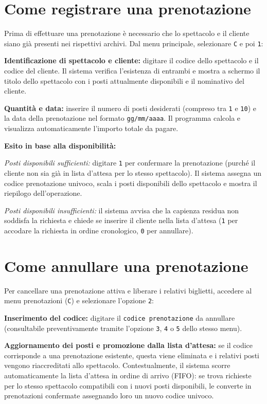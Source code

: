 \documentclass[11pt,a4paper,oneside,openany]{book}
\newenvironment{listacomp}{%
    \small
    \begin{list}{\textendash}{%
        \setlength{\topsep}{2pt}%
        \setlength{\partopsep}{0pt}%
        \setlength{\itemsep}{1pt}%
        \setlength{\parsep}{0pt}%
        \setlength{\leftmargin}{1.2em}%
    }%
}{%
    \end{list}%
}
\begin{document}
\section{Come registrare una prenotazione}
Prima di effettuare una prenotazione è necessario che lo spettacolo e il cliente siano già presenti nei rispettivi archivi. Dal menu principale, selezionare \texttt{C} e poi \texttt{1}:
\begin{listacomp}
    \item \textbf{Identificazione di spettacolo e cliente:} digitare il codice dello spettacolo e il codice del cliente. Il sistema verifica l'esistenza di entrambi e mostra a schermo il titolo dello spettacolo con i posti attualmente disponibili e il nominativo del cliente.
    \item \textbf{Quantità e data:} inserire il numero di posti desiderati (compreso tra \texttt{1} e \texttt{10}) e la data della prenotazione nel formato \texttt{gg/mm/aaaa}. Il programma calcola e visualizza automaticamente l'importo totale da pagare.
    \item \textbf{Esito in base alla disponibilità:}
    \begin{listacomp}
        \item \emph{Posti disponibili sufficienti:} digitare \texttt{1} per confermare la prenotazione (purché il cliente non sia già in lista d'attesa per lo stesso spettacolo). Il sistema assegna un codice prenotazione univoco, scala i posti disponibili dello spettacolo e mostra il riepilogo dell'operazione.
        \item \emph{Posti disponibili insufficienti:} il sistema avvisa che la capienza residua non soddisfa la richiesta e chiede se inserire il cliente nella lista d'attesa (\texttt{1} per accodare la richiesta in ordine cronologico, \texttt{0} per annullare).
    \end{listacomp}
\end{listacomp}

\section{Come annullare una prenotazione}
Per cancellare una prenotazione attiva e liberare i relativi biglietti, accedere al menu prenotazioni (\texttt{C}) e selezionare l'opzione \texttt{2}:
\begin{listacomp}
    \item \textbf{Inserimento del codice:} digitare il \texttt{codice prenotazione} da annullare (consultabile preventivamente tramite l'opzione \texttt{3}, \texttt{4} o \texttt{5} dello stesso menu).
    \item \textbf{Aggiornamento dei posti e promozione dalla lista d'attesa:} se il codice corrisponde a una prenotazione esistente, questa viene eliminata e i relativi posti vengono riaccreditati allo spettacolo. Contestualmente, il sistema scorre automaticamente la lista d'attesa in ordine di arrivo (FIFO): se trova richieste per lo stesso spettacolo compatibili con i nuovi posti disponibili, le converte in prenotazioni confermate assegnando loro un nuovo codice univoco.
\end{listacomp}
\end{document}
